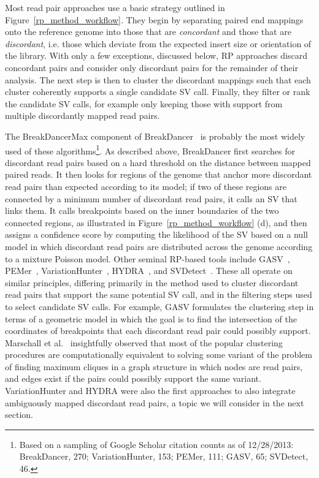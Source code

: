 Most read pair approaches use a basic strategy outlined in Figure~\ref{rp_method_workflow}. They begin by separating paired end mappings onto the reference genome into those that are \emph{concordant} and those that are \emph{discordant}, i.e. those which deviate from the expected insert size or orientation of the library. With only a few exceptions, discussed below, RP approaches discard concordant pairs and consider only discordant pairs for the remainder of their analysis. The next step is then to cluster the discordant mappings such that each cluster coherently supports a single candidate SV call. Finally, they filter or rank the candidate SV calls, for example only keeping those with support from multiple discordantly mapped read pairs. 

The BreakDancerMax component of BreakDancer~\cite{Chen:2009p3} is probably the most widely used of these algorithms\footnote{Based on a sampling of Google Scholar citation counts as of 12/28/2013: BreakDancer, 270; VariationHunter, 153; PEMer, 111; GASV, 65; SVDetect, 46.}. As described above, BreakDancer first searches for discordant read pairs based on a hard threshold on the distance between mapped paired reads. It then looks for regions of the genome that anchor more discordant read pairs than expected according to its model; if two of these regions are connected by a minimum number of discordant read pairs, it calls an SV that links them. It calls breakpoints based on the inner boundaries of the two connected regions, as illustrated in Figure~\ref{rp_method_workflow} (d), and then assigns a confidence score by computing the likelihood of the SV based on a null model in which discordant read pairs are distributed across the genome according to a mixture Poisson model. Other seminal RP-based tools include GASV~\cite{Sindi:2009gu}, PEMer~\cite{Korbel:2009dy}, VariationHunter~\cite{Hormozdiari:2009p284}, HYDRA~\cite{Quinlan:2010gf}, and SVDetect~\cite{Zeitouni:2010p8}. These all operate on similar principles, differing primarily in the method used to cluster discordant read pairs that support the same potential SV call, and in the filtering steps used to select candidate SV calls. For example, GASV formulates the clustering step in terms of a geometric model in which the goal is to find the intersection of the coordinates of breakpoints that each discordant read pair could possibly support. Marschall et al.~\cite{Marschall:2012ek} insightfully observed that most of the popular clustering procedures are computationally equivalent to solving some variant of the problem of finding maximum cliques in a graph structure in which nodes are read pairs, and edges exist if the pairs could possibly support the same variant. VariationHunter and HYDRA were also the first approaches to also integrate ambiguously mapped discordant read pairs, a topic we will consider in the next section.

